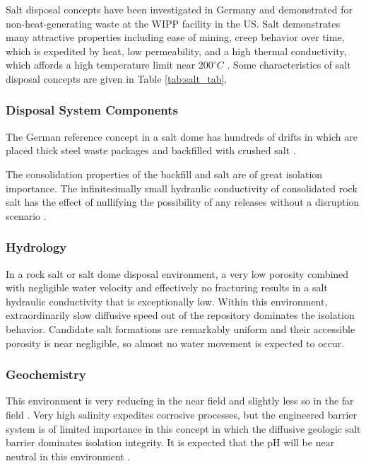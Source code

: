 Salt disposal concepts have been investigated in Germany and demonstrated for 
non-heat-generating waste at the \gls{WIPP} facility in the US. Salt 
demonstrates many attractive properties including ease of mining, creep behavior 
over time, which is expedited by heat, low permeability, and a high thermal 
conductivity, which affords a high temperature limit near $200^{\circ}C$ 
\cite{hardin_generic_2011}.
Some characteristics of salt disposal 
concepts are given in Table \ref{tab:salt_tab}.   



\subsubsection{Disposal System Components}

The German reference concept in a salt dome has hundreds of drifts in which 
are placed thick steel waste packages and backfilled with crushed salt 
\cite{von_lensa_red-impact_2008}. 

The consolidation properties of the backfill and salt are of great isolation 
importance. The infinitesimally small hydraulic conductivity of consolidated 
rock salt has the effect of nullifying the possibility of any releases without 
a disruption scenario \cite{brewitz_long-term_2002}.


\subsubsection{Hydrology}

In a rock salt or salt dome disposal environment, a very low porosity combined 
with negligible water velocity and effectively no fracturing results in a 
salt hydraulic conductivity that is exceptionally low. Within this environment,   
extraordinarily slow diffusive speed out of the repository dominates the 
isolation behavior. Candidate salt formations are remarkably uniform and their 
accessible porosity is near negligible, so almost no water movement is expected to 
occur. 

\subsubsection{Geochemistry}

This environment is very reducing in the near field and slightly less so in 
the far field \cite{clayton_generic_2011}. Very high salinity
expedites corrosive processes, but the engineered barrier system 
is of limited importance in this concept in which the diffusive geologic salt barrier 
dominates isolation integrity.  It is expected that the pH will be near
neutral in this environment \cite{von_lensa_red-impact_2008, clayton_generic_2011}.

